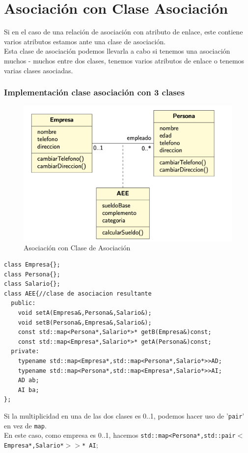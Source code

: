 \chapter{ Asociación con Clase Asociación}
Si en el caso de una relación de asociación con atributo de enlace, este contiene varios atributos estamos ante una clase de asociación.\\
Esta clase de asociación podemos llevarla a cabo si tenemos una asociación muchos - muchos entre dos clases, tenemos varios atributos de enlace o tenemos varias clases asociadas.
\subsection{Implementación clase asociación con 3 clases}
\begin{figure}[h]
    \centering
    \includegraphics[width=\textwidth]{Imagenes/AClS.png}
    \caption{Asociación con Clase de Asociación}
\end{figure}
\begin{center}
	\begin{lstlisting}[frame=single]
class Empresa{};
class Persona{};
class Salario{};
class AEE{//clase de asociacion resultante
  public:
    void setA(Empresa&,Persona&,Salario&);
    void setB(Persona&,Empresa&,Salario&);
    const std::map<Persona*,Salario*>* getB(Empresa&)const;
    const std::map<Empresa*,Salario*>* getA(Persona&)const;
  private:
    typename std::map<Empresa*,std::map<Persona*,Salario*>>AD;
    typename std::map<Persona*,std::map<Empresa*,Salario*>>AI;
    AD ab;
    AI ba;
};
\end{lstlisting}
\end{center}
Si la multiplicidad en una de las dos clases es 0..1, podemos hacer uso de '\texttt{pair}' en vez de \texttt{map}.\\
En este caso, como empresa es 0..1, hacemos \texttt{std::map<Persona*,std::pair$<$Empresa*,Salario*$>$$>$* AI$;$}
